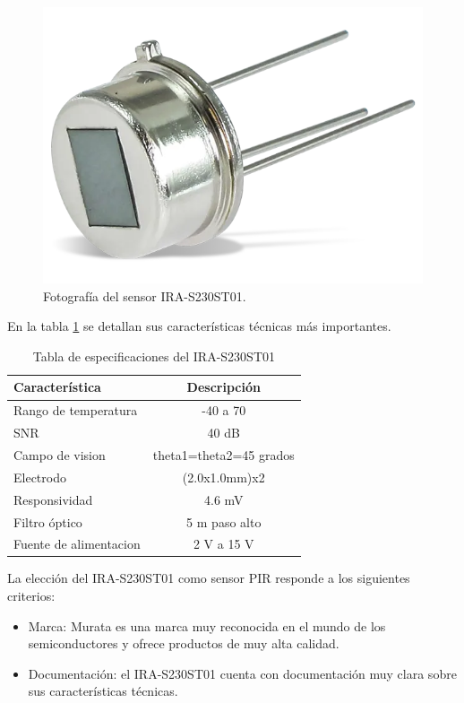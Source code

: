 \begin{figure}[h]
	\centering
	\includegraphics[scale=0.2]{./Figures/pir_photo.png}
	\caption{Fotografía del sensor IRA-S230ST01\protect\footnotemark.}
	\label{fig:pir_photo}
\end{figure}

En la tabla \ref{tab:pir_specs} se detallan sus características técnicas más importantes.

\begin{table}[h]
	\centering
	\caption[IRA-S230ST01 especificaciones]{Tabla de especificaciones del IRA-S230ST01}
	\begin{tabular}{lc}   
		\toprule
		\textbf{Característica} 	 & \textbf{Descripción}  \\
		\midrule
		Rango de temperatura & -40 \textcelsius a 70 \textcelsius\\
		SNR & 40 dB \\
		Campo de vision & theta1=theta2=45 grados \\
		Electrodo & (2.0x1.0mm)x2 \\
		Responsividad & 4.6 mV \\
		Filtro óptico & 5 \textmu m paso alto \\
		Fuente de alimentacion & 2 V a 15 V \\
		\bottomrule
		\hline
	\end{tabular}
	\label{tab:pir_specs}
\end{table}

La elección del IRA-S230ST01 como sensor PIR responde a los siguientes criterios:
\begin{itemize}
	\item Marca: Murata es una marca muy reconocida en el mundo de los semiconductores y ofrece productos de muy alta calidad.
	\item Documentación: el IRA-S230ST01 cuenta con documentación muy clara sobre sus características técnicas.
\end{itemize}


